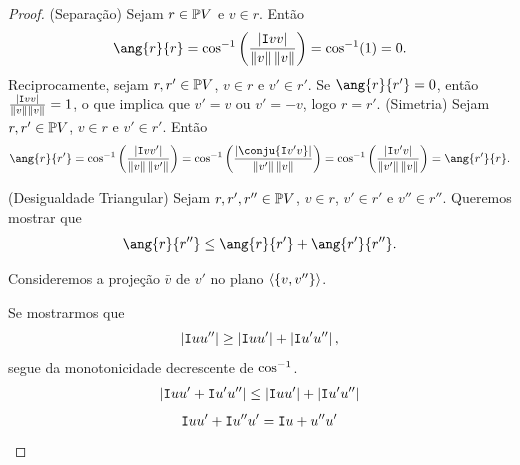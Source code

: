 \begin{proof}

(Separação) Sejam $r \in \mathbb{P} V$ e $v \in r$. Então
	\begin{equation*}
	\ang{r}{r} = \cos\inv \left( \frac{\abs{\inte{v}{v}}}{\nor{v}\nor{v}} \right) = \cos\inv (1) = 0.
	\end{equation*}
Reciprocamente, sejam $r,r' \in \mathbb{P} V$, $v \in r$ e $v' \in r'$. Se $\ang{r}{r'} = 0$, então $\frac{\left\vert{\mathtt I{v}{v}}\right\vert}{\left\Vert{v}\right\Vert\left\Vert{v}\right\Vert}= 1$, o que implica que $v'=v$ ou $v'=-v$, logo $r=r'$.
(Simetria) Sejam $r,r' \in \mathbb{P} V$, $v \in r$ e $v' \in r'$. Então
	\begin{equation*}
	\ang{r}{r'} = \cos\inv \left( \frac{\abs{\inte{v}{v'}}}{\nor{v}\nor{v'}} \right) = \cos\inv \left( \frac{\abs{\conju{\inte{v'}{v}}}}{\nor{v'}\nor{v}} \right) = \cos\inv \left( \frac{\abs{\inte{v'}{v}}}{\nor{v'}\nor{v}} \right) = \ang{r'}{r}.
	\end{equation*}

(Desigualdade Triangular) Sejam $r,r',r'' \in \mathbb{P} V$, $v \in r$, $v' \in r'$ e $v'' \in r''$. Queremos mostrar que
	\begin{equation*}
	\ang{r}{r''} \leq \ang{r}{r'} + \ang{r'}{r''}.
	\end{equation*}
%

Consideremos a projeção $\bar v$ de $v'$ no plano $\left\langle \{v,v''\} \right\rangle$. 	

Se mostrarmos que
	\begin{equation*}
	\left\vert{\mathtt I{u}{u''}}\right\vert \geq \left\vert{\mathtt I{u}{u'}}\right\vert + \left\vert{\mathtt I{u'}{u''}}\right\vert,
	\end{equation*}
segue da monotonicidade decrescente de $\cos^{-1}$.
	\begin{align*}
	\left\vert{\mathtt I{u}{u'}+\mathtt I{u'}{u''}}\right\vert \leq \left\vert{\mathtt I{u}{u'}}\right\vert + \left\vert{\mathtt I{u'}{u''}}\right\vert
	\end{align*}
	\begin{align*}
	\mathtt I{u}{u'}+\mathtt I{u''}{u'} = \mathtt I{u+u''}{u'}
	\end{align*}
\end{proof}

